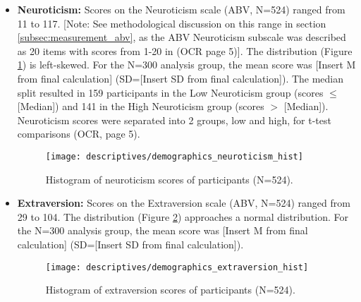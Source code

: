 \documentclass[11pt, a4paper]{report}
\newcommand{\jsoncite}[1]{\href{run:./data/#1.json}{\texttt{\detokenize{#1.json}}}}
\begin{document}
\begin{itemize}
    \item \textbf{Neuroticism:} Scores on the Neuroticism scale (ABV, N=524) ranged from 11 to 117. [Note: See methodological discussion on this range in section \ref{subsec:measurement_abv}, as the ABV Neuroticism subscale was described as 20 items with scores from 1-20 in \cite{ThesisTempPDF} (OCR page 5)]. The distribution (Figure \ref{fig:hist_neuroticism_results}) is left-skewed. For the N=300 analysis group, the mean score was [Insert M from final calculation] (SD=[Insert SD from final calculation]). The median split resulted in 159 participants in the Low Neuroticism group (scores $\le$ [Median]) and 141 in the High Neuroticism group (scores $>$ [Median]). Neuroticism scores were separated into 2 groups, low and high, for t-test comparisons \cite{ThesisTempPDF} (OCR, page 5).
    \begin{figure}[H]
        \centering
        \texttt{[image: descriptives/demographics\_neuroticism\_hist]}
        \caption{Histogram of neuroticism scores of participants (N=524).}
        \label{fig:hist_neuroticism_results}
    \end{figure}

    \item \textbf{Extraversion:} Scores on the Extraversion scale (ABV, N=524) ranged from 29 to 104. The distribution (Figure \ref{fig:hist_extraversion_results}) approaches a normal distribution. For the N=300 analysis group, the mean score was [Insert M from final calculation] (SD=[Insert SD from final calculation]).
    \begin{figure}[H]
        \centering
        \texttt{[image: descriptives/demographics\_extraversion\_hist]}
        \caption{Histogram of extraversion scores of participants (N=524).}
        \label{fig:hist_extraversion_results}
    \end{figure}
\end{itemize}
\end{document}
